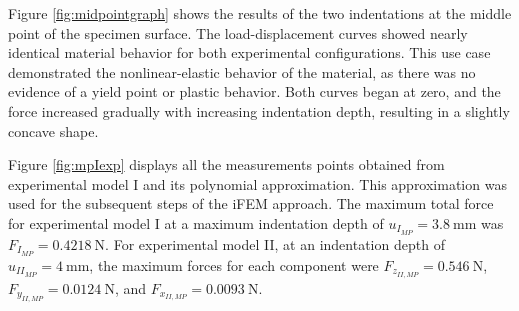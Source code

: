 Figure \ref{fig:midpointgraph} shows the results of the two indentations at the middle point 
 of the specimen surface.
The load-displacement curves showed nearly identical material behavior for both 
experimental configurations. This use case demonstrated the nonlinear-elastic behavior of the material, 
as there was no evidence of a yield point or plastic behavior. 
Both curves began at zero, and the force increased gradually with increasing indentation depth,
resulting in a slightly concave shape. 

Figure \ref{fig:mpIexp} displays all the measurements points obtained from experimental model I and its 
polynomial approximation. This approximation was used for the subsequent steps of the iFEM approach. The 
maximum total force for experimental model I at a maximum indentation depth of 
$u_{I_{MP}} = \SI{3.8}{\milli \m}$ was $F_{I_{MP}} = \SI{0.4218}{\newton}$. For experimental 
model II, at an indentation depth of 
$u_{II_{MP}} = \SI{4}{\milli \m}$, the maximum forces for each component were
$F_{z_{II,MP}} = \SI{0.546}{\newton}$, $F_{y_{II,MP}} = \SI{0.0124}{\newton}$, and $F_{x_{II,MP}} = \SI{0.0093}{\newton}$.\\

